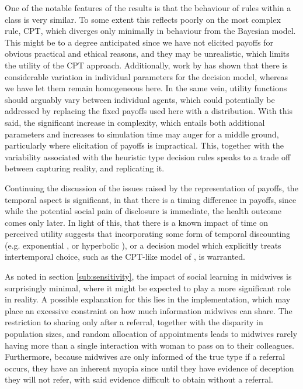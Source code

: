 \documentclass[graybox]{svmult}
\begin{document}
One of the notable features of the results is that the behaviour of rules within a class is very similar. To some extent this reflects poorly on the most complex rule, \ac{CPT}, which diverges only minimally in behaviour from the Bayesian model. This might be to a degree anticipated since we have not elicited payoffs for obvious practical and ethical reasons, and they may be unrealistic, which limits the utility of the \ac{CPT} approach.  Additionally, work by \citet{Glockner2012} has shown that there is considerable variation in individual parameters for the decision model, whereas we have let them remain homogeneous here. In the same vein, utility functions should arguably vary between individual agents, which could potentially be addressed by replacing the fixed payoffs used here with a distribution.  With this said, the significant increase in complexity, which entails both additional parameters and increases to simulation time may auger for a middle ground, particularly where elicitation of payoffs is impractical.  This, together with the variability associated with the heuristic type decision rules speaks to a trade off between capturing reality, and replicating it.

Continuing the discussion of the issues raised by the representation of payoffs, the temporal aspect is significant, in that there is a timing difference in payoffs, since while the potential social pain of disclosure is immediate, the health outcome comes only later. In light of this, that there is a known impact of time on perceived utility \citet{Thaler1981} suggests that incorporating some form of temporal discounting (e.g. exponential \citep{Samuelson1937}, or hyperbolic \citep{Ainslie1991}), or a decision model which explicitly treats intertemporal choice, such as the \ac{CPT}-like model of \citet{Loewenstein1992}, is warranted. 

As noted in section \ref{sub:sensitivity}, the impact of social learning in midwives is surprisingly minimal, where it might be expected to play a more significant role in reality. A possible explanation for this lies in the implementation, which may place an excessive constraint on how much information midwives can share. The restriction to sharing only after a referral, together with the disparity in population sizes, and random allocation of appointments leads to midwives rarely having more than a single interaction with woman to pass on to their colleagues. Furthermore, because midwives are only informed of the true type if a referral occurs, they have an inherent myopia since until they have evidence of deception they will not refer, with said evidence difficult to obtain without a referral.
\end{document}
